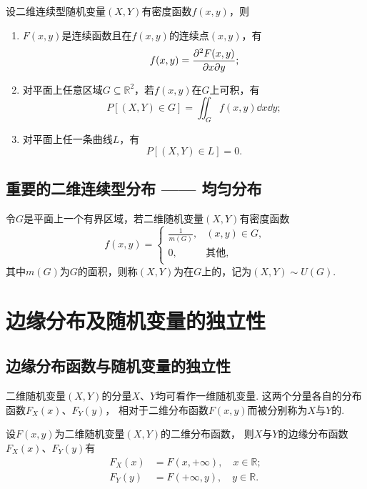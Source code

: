 \begin{theorem}
设二维连续型随机变量\((X,Y)\)有密度函数\(f(x,y)\)，则
\begin{enumerate}
	\item \(F(x,y)\)是连续函数且在\(f(x,y)\)的连续点\((x,y)\)，有\[
		f(x,y) = \pdv{F(x,y)}{x}{y};
	\]

	\item 对平面上任意区域\(G \subseteq \mathbb{R}^2\)，若\(f(x,y)\)在\(G\)上可积，有\[
		P\left[(X,Y) \in G\right] = \iint_G{f(x,y) \dd{x}\dd{y}};
	\]

	\item 对平面上任一条曲线\(L\)，有\[
		P\left[(X,Y) \in L\right] = 0.
	\]
\end{enumerate}
\end{theorem}

\subsection{重要的二维连续型分布 —— 均匀分布}
\begin{definition}
令\(G\)是平面上一个有界区域，若二维随机变量\((X,Y)\)有密度函数\[
f(x,y) = \left\{ \begin{array}{ll}
\frac{1}{m(G)}, & (x,y) \in G, \\
0, & \text{其他}, \\
\end{array} \right.
\]其中\(m(G)\)为\(G\)的面积，则称\((X,Y)\)为在\(G\)上的，记为\((X,Y) \sim U(G)\).
\end{definition}

\section{边缘分布及随机变量的独立性}
\subsection{边缘分布函数与随机变量的独立性}
\begin{definition}
二维随机变量\((X,Y)\)的分量\(X\)、\(Y\)均可看作一维随机变量.
这两个分量各自的分布函数\(F_X(x)\)、\(F_Y(y)\)，
相对于二维分布函数\(F(x,y)\)而被分别称为\(X\)与\(Y\)的.
\end{definition}

\begin{theorem}
设\(F(x,y)\)为二维随机变量\((X,Y)\)的二维分布函数，
则\(X\)与\(Y\)的边缘分布函数\(F_X(x)\)、\(F_Y(y)\)有
\begin{align*}
	F_X(x) &= F(x,+\infty), \quad x \in \mathbb{R}; \\
	F_Y(y) &= F(+\infty,y), \quad y \in \mathbb{R}.
\end{align*}
\end{theorem}

